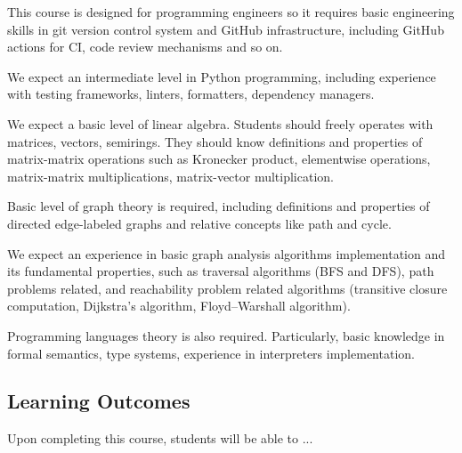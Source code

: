 \documentclass[sigconf]{acmart}
\begin{document}
This course is designed for programming engineers so it requires basic engineering skills in git version control system and GitHub infrastructure, including GitHub actions for CI, code review mechanisms and so on.

We expect an intermediate level in Python programming, including experience with testing frameworks, linters, formatters, dependency managers. 

We expect a basic level of linear algebra.
Students should freely operates with matrices, vectors, semirings.
They should know definitions and properties of matrix-matrix operations such as Kronecker product, elementwise operations, matrix-matrix multiplications, matrix-vector multiplication. 

Basic level of graph theory is required, including definitions and properties of directed edge-labeled graphs and relative concepts like path and cycle.

We expect an experience in basic graph analysis algorithms implementation and its fundamental properties, such as traversal algorithms (BFS and DFS), path problems related, and reachability problem related algorithms (transitive closure computation, Dijkstra's algorithm, Floyd–Warshall algorithm).

Programming languages theory is also required. 
Particularly, basic knowledge in formal semantics, type systems, experience in interpreters implementation.

\subsection{Learning Outcomes}

Upon completing this course, students will be able to ...
\end{document}
